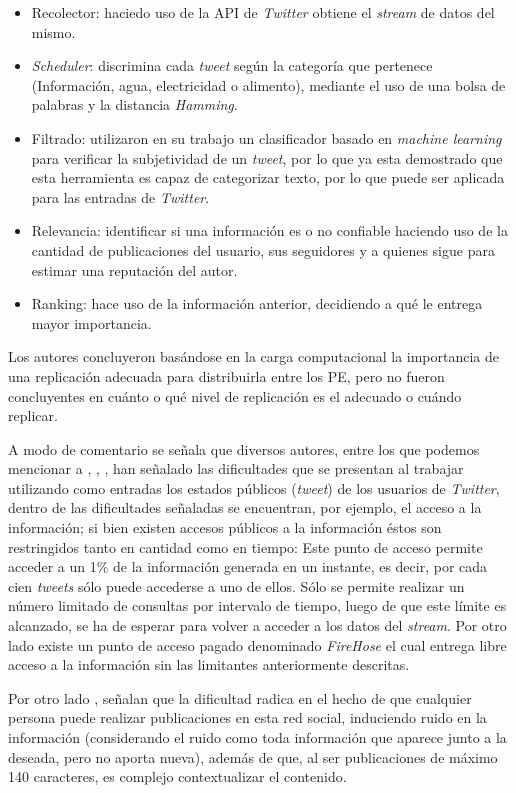 \begin{itemize}
\item Recolector: haciedo uso de la API de \textit{Twitter} obtiene el \textit{stream} de datos del mismo. 
\item \textit{Scheduler}: discrimina cada \textit{tweet} según la categoría que pertenece (Información, agua, electricidad o alimento), mediante el uso de una bolsa de palabras y la distancia \textit{Hamming}.
\item Filtrado: utilizaron en su trabajo un clasificador basado en \textit{machine learning} para verificar la subjetividad de un \textit{tweet}, por lo que ya esta demostrado que esta herramienta es capaz de categorizar texto, por lo que puede ser aplicada para las entradas de \textit{Twitter}.
\item Relevancia: identificar si una información es o no confiable haciendo uso de la cantidad de publicaciones del usuario, sus seguidores y a quienes sigue para estimar una reputación del autor.
\item Ranking: hace uso de la información anterior, decidiendo a qué le entrega mayor importancia.
\end{itemize}

Los autores concluyeron basándose en la carga computacional la importancia de una replicación adecuada para distribuirla entre los PE, pero no fueron concluyentes en cuánto o qué nivel de replicación es el adecuado o cuándo replicar.

A modo de comentario se señala que diversos autores, entre los que podemos mencionar a \cite{VanDeVoort}, \cite{EventDetectionInTwitter}, \cite{Maldonado}, han señalado las dificultades que se presentan al trabajar utilizando como entradas los estados públicos (\textit{tweet}) de los usuarios de \textit{Twitter}, dentro de las dificultades señaladas se encuentran, por ejemplo, el acceso a la información; si bien existen accesos públicos a la información éstos son restringidos tanto en cantidad como en tiempo: Este punto de acceso permite acceder a un 1\% de la información generada en un instante, es decir, por cada cien \textit{tweets} sólo puede accederse a uno de ellos. Sólo se permite realizar un número limitado de consultas por intervalo de tiempo, luego de que este límite es alcanzado, se ha de esperar para volver a acceder a los datos del \textit{stream}. Por otro lado existe un punto de acceso pagado denominado \textit{FireHose} el cual entrega libre acceso a la información sin las limitantes anteriormente descritas.

Por otro lado \cite{VanDeVoort}, señalan que la dificultad radica en el hecho de que cualquier persona puede realizar publicaciones en esta red social, induciendo ruido en la información (considerando el ruido como toda información que aparece junto a la deseada, pero no aporta nueva), además de que, al ser publicaciones de máximo 140 caracteres, es complejo contextualizar el contenido.
